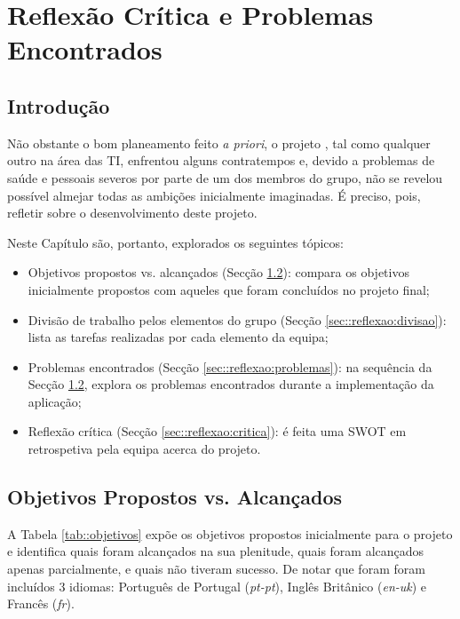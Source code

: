 \chapter{Reflexão Crítica e Problemas Encontrados}
\label{ch::reflexao}

\section{Introdução}
\label{sec::reflexao:intro}

Não obstante o bom planeamento feito \textit{a priori}, o projeto \theapp, tal como qualquer outro na área das \ac{TI}, enfrentou alguns contratempos e, devido a problemas de saúde e pessoais severos por parte de um dos membros do grupo, não se revelou possível almejar todas as ambições inicialmente imaginadas. É preciso, pois, refletir sobre o desenvolvimento deste projeto.

Neste Capítulo são, portanto, explorados os seguintes tópicos:

\begin{itemize}
	\item Objetivos propostos vs. alcançados (Secção \ref{sec::reflexao:objetivos}): compara os objetivos inicialmente propostos com aqueles que foram concluídos no projeto final;
	\item Divisão de trabalho pelos elementos do grupo (Secção \ref{sec::reflexao:divisao}): lista as tarefas realizadas por cada elemento da equipa;
	\item Problemas encontrados (Secção \ref{sec::reflexao:problemas}): na sequência da Secção \ref{sec::reflexao:objetivos}, explora os problemas encontrados durante a implementação da aplicação;
	\item Reflexão crítica (Secção \ref{sec::reflexao:critica}): é feita uma \ac{SWOT} em retrospetiva pela equipa acerca do projeto.
\end{itemize}



\section{Objetivos Propostos vs. Alcançados}
\label{sec::reflexao:objetivos}

A Tabela \ref{tab::objetivos} expõe os objetivos propostos inicialmente para o projeto e identifica quais foram alcançados na sua plenitude, quais foram alcançados apenas parcialmente, e quais não tiveram sucesso. De notar que foram foram incluídos 3 idiomas: Português de Portugal (\textit{pt-pt}), Inglês Britânico (\textit{en-uk}) e Francês (\textit{fr}).

